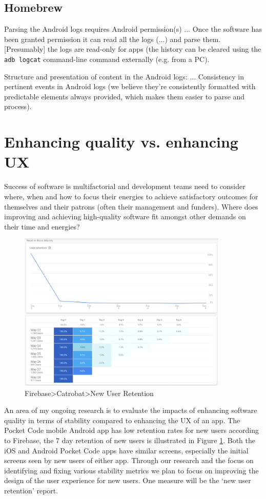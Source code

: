 \subsection{Homebrew}
Parsing the Android logs requires Android permission(s) ... Once the software has been granted permission it can read all the logs (...) and parse them. [Presumably] the logs are read-only for apps (the history can be cleared using the \texttt{adb logcat} command-line command externally (e.g. from a PC).

Structure and presentation of content in the Android logs: ...
Consistency in pertinent events in Android logs (we believe they're consistently formatted with predictable elements always provided, which makes them easier to parse and process).



\section{Enhancing quality vs. enhancing UX}
Success of software is multifactorial and development teams need to consider where, when and how to focus their energies to achieve satisfactory outcomes for themselves and their patrons (often their management and funders). Where does improving and achieving high-quality software fit amongst other demands on their time and energies?

\begin{figure}[ht]
    \centering
    \includegraphics[width=10cm]{images/firebase/Firebase-pocketcode-android-7-day-new-user-retention-29-may-2020.png}
    \caption{Firebase>Catrobat>New User Retention}
    \label{fig:Firebase-pocketcode-android-7-day-new-user-retention-29-may-2020}
\end{figure}

An area of my ongoing research is to evaluate the impacts of enhancing software quality in terms of stability compared to enhancing the UX of an app. The Pocket Code mobile Android app has low retention rates for new users according to Firebase, the 7 day retention of new users is illustrated in Figure \ref{fig:Firebase-pocketcode-android-7-day-new-user-retention-29-may-2020}. Both the iOS and Android Pocket Code apps have similar screens, especially the initial screens seen by new users of either app. Through our research and the focus on identifying and fixing various stability metrics we plan to focus on improving the design of the user experience for new users. One measure will be the `new user retention' report.

